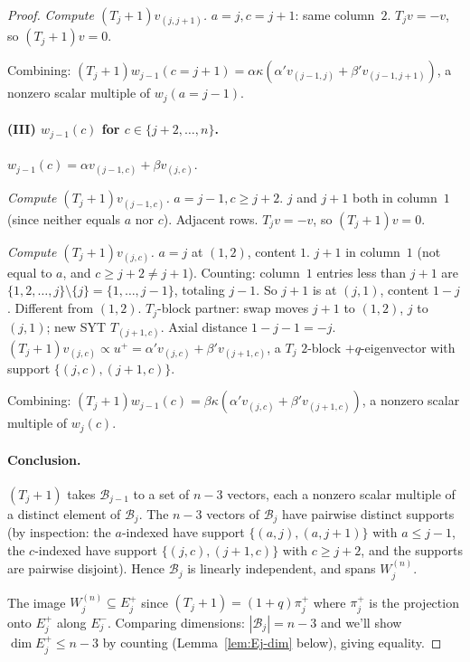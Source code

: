 \documentclass[11pt]{article}
\theoremstyle{definition}
\begin{document}
\begin{proof}
\emph{Compute $(T_j{+}1)v_{(j,j+1)}$.} $a = j, c = j+1$: same column~$2$.
$T_jv = -v$, so $(T_j{+}1)v = 0$.

Combining: $(T_j{+}1)w_{j-1}(c=j+1) = \alpha\kappa(\alpha' v_{(j-1,j)}
+ \beta' v_{(j-1,j+1)})$, a nonzero scalar multiple of $w_j(a=j-1)$.
\checkmark

\paragraph{(III) $w_{j-1}(c)$ for $c \in \{j+2,\ldots,n\}$.}
$w_{j-1}(c) = \alpha v_{(j-1,c)} + \beta v_{(j,c)}$.

\emph{Compute $(T_j{+}1)v_{(j-1,c)}$.} $a = j-1, c \ge j+2$.
$j$ and $j+1$ both in column~$1$ (since neither equals $a$ nor $c$).
Adjacent rows.  $T_jv = -v$, so $(T_j{+}1)v = 0$.

\emph{Compute $(T_j{+}1)v_{(j,c)}$.} $a = j$ at $(1,2)$, content $1$.
$j+1$ in column~$1$ (not equal to $a$, and $c \ge j+2 \ne j+1$).
Counting: column~$1$ entries less than $j+1$ are
$\{1, 2, \ldots, j\} \setminus \{j\} = \{1,\ldots,j-1\}$, totaling
$j-1$.  So $j+1$ is at $(j,1)$, content $1-j$.  Different from
$(1,2)$.  $T_j$-block partner: swap moves $j+1$ to $(1,2)$, $j$ to
$(j,1)$; new SYT $T_{(j+1,c)}$.  Axial distance $1-j-1=-j$.
$(T_j{+}1)v_{(j,c)} \propto u^+ = \alpha'v_{(j,c)} + \beta'v_{(j+1,c)}$,
a $T_j$ $2$-block $+q$-eigenvector with support $\{(j,c),(j+1,c)\}$.

Combining: $(T_j{+}1)w_{j-1}(c) = \beta\kappa(\alpha'v_{(j,c)}
+ \beta'v_{(j+1,c)})$, a nonzero scalar multiple of $w_j(c)$.
\checkmark

\paragraph{Conclusion.}
$(T_j{+}1)$ takes $\mathcal{B}_{j-1}$ to a set of $n-3$ vectors, each
a nonzero scalar multiple of a distinct element of $\mathcal{B}_j$.
The $n-3$ vectors of $\mathcal{B}_j$ have pairwise distinct supports
(by inspection: the $a$-indexed have support
$\{(a,j),(a,j+1)\}$ with $a \le j-1$, the $c$-indexed have support
$\{(j,c),(j+1,c)\}$ with $c \ge j+2$, and the supports are pairwise
disjoint).  Hence $\mathcal{B}_j$ is linearly independent, and spans
$W_j^{(n)}$.

The image $W_j^{(n)} \subseteq E_j^+$ since $(T_j{+}1) = (1+q)\pi_j^+$
where $\pi_j^+$ is the projection onto $E_j^+$ along $E_j^-$.
Comparing dimensions: $|\mathcal{B}_j| = n-3$ and we'll show
$\dim E_j^+ \le n-3$ by counting (Lemma~\ref{lem:Ej-dim} below), giving
equality.
\end{proof}
\end{document}
